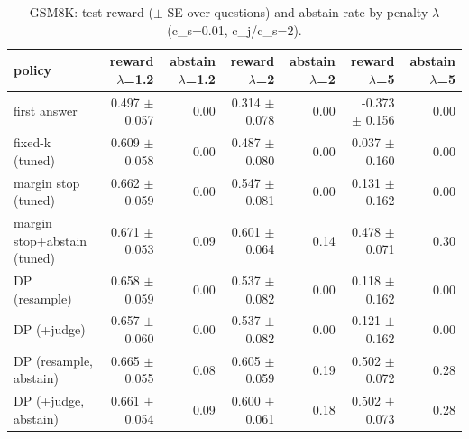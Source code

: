 \begin{table}[t]
\centering
\small
\caption{GSM8K: test reward ($\pm$ SE over questions) and abstain rate by penalty $\lambda$ (c\_s=0.01, c\_j/c\_s=2).}
\label{tab:reward_vs_lambda_gsm8k}
\begin{tabular}{lrrrrrr}
\toprule
policy & reward $\lambda$=1.2 & abstain $\lambda$=1.2 & reward $\lambda$=2 & abstain $\lambda$=2 & reward $\lambda$=5 & abstain $\lambda$=5 \\
\midrule
first answer & 0.497 $\pm$ 0.057 & 0.00 & 0.314 $\pm$ 0.078 & 0.00 & -0.373 $\pm$ 0.156 & 0.00 \\
fixed-k (tuned) & 0.609 $\pm$ 0.058 & 0.00 & 0.487 $\pm$ 0.080 & 0.00 & 0.037 $\pm$ 0.160 & 0.00 \\
margin stop (tuned) & 0.662 $\pm$ 0.059 & 0.00 & 0.547 $\pm$ 0.081 & 0.00 & 0.131 $\pm$ 0.162 & 0.00 \\
margin stop+abstain (tuned) & 0.671 $\pm$ 0.053 & 0.09 & 0.601 $\pm$ 0.064 & 0.14 & 0.478 $\pm$ 0.071 & 0.30 \\
DP (resample) & 0.658 $\pm$ 0.059 & 0.00 & 0.537 $\pm$ 0.082 & 0.00 & 0.118 $\pm$ 0.162 & 0.00 \\
DP (+judge) & 0.657 $\pm$ 0.060 & 0.00 & 0.537 $\pm$ 0.082 & 0.00 & 0.121 $\pm$ 0.162 & 0.00 \\
DP (resample, abstain) & 0.665 $\pm$ 0.055 & 0.08 & 0.605 $\pm$ 0.059 & 0.19 & 0.502 $\pm$ 0.072 & 0.28 \\
DP (+judge, abstain) & 0.661 $\pm$ 0.054 & 0.09 & 0.600 $\pm$ 0.061 & 0.18 & 0.502 $\pm$ 0.073 & 0.28 \\
\bottomrule
\end{tabular}
\end{table}
